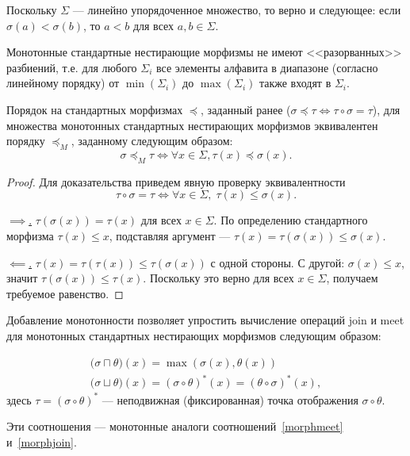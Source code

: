 \documentclass[fontsize=14pt]{scrartcl}
\begin{document}
Поскольку $\Sigma$ --- линейно упорядоченное множество, то верно и следующее: если $\sigma(a) < \sigma(b)$, то $a < b$ для всех $a, b \in \Sigma$.

Монотонные стандартные нестирающие морфизмы не имеют <<разорванных>> разбиений, т.е. для любого $\Sigma_i$
все элементы алфавита в диапазоне (согласно линейному порядку) от $\min(\Sigma_i)$ до $\max(\Sigma_i)$ также входят в $\Sigma_i$. 

\begin{Proposition}
    Порядок на стандартных морфизмах $\preceq$, заданный ранее ($\sigma \preceq \tau \iff \tau \circ \sigma = \tau$), для 
    множества монотонных стандартных нестирающих морфизмов эквивалентен порядку 
    $\preceq_M$, заданному следующим образом:
    $$
    \sigma \preceq_M \tau \iff \forall x \in \Sigma, \tau(x) \preceq \sigma(x).
    $$
\end{Proposition}

\begin{proof}
    Для доказательства приведем явную проверку эквивалентности 
    $$
    \tau \circ \sigma = \tau \iff \forall x \in \Sigma, \; \tau(x) \leq \sigma(x).
    $$

    \underline{$\implies$.} 
    $\tau(\sigma(x)) = \tau(x)$ для всех $x \in \Sigma$. По определению стандартного морфизма $\tau(x) \leq x$, подставляя аргумент ---
    $\tau(x) = \tau(\sigma(x)) \leq \sigma(x)$.
    
    \underline{$\impliedby$.} 
    $\tau(x) = \tau(\tau(x)) \leq \tau(\sigma(x))$ с одной стороны. С другой: $\sigma(x) \leq x$, значит $\tau(\sigma(x)) \leq \tau(x)$. Поскольку
    это верно для всех $x \in \Sigma$, получаем требуемое равенство.
\end{proof}

Добавление монотонности позволяет упростить вычисление операций join и meet для монотонных стандартных нестирающих морфизмов следующим образом:

\begin{align}
  \label{morphmeetmono}
  \bigl(\sigma \sqcap \theta \bigr)(x) = \max (\sigma (x), \theta(x))\\
  \label{morphjoinmono}
  \bigl(\sigma \sqcup \theta\bigr)(x) = (\sigma \circ \theta)^* (x) = (\theta \circ \sigma)^* (x),
\end{align}
здесь $\tau = (\sigma \circ \theta)^*$ --- неподвижная (фиксированная) точка отображения $\sigma \circ \theta$. 

Эти соотношения --- монотонные аналоги соотношений~\ref{morphmeet} и~\ref{morphjoin}. 
\end{document}
